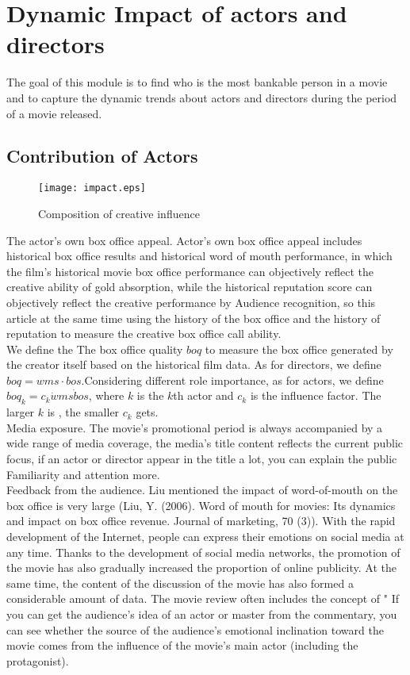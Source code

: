 \section{Dynamic Impact of actors and directors}
\label{sec:impact}
The goal of this module is to find who is the most bankable person in a movie and to capture the dynamic trends about actors and directors during the period of a movie released.\\

\subsection{Contribution of Actors}
\begin{figure}[!htbp]
\centering
\texttt{[image: impact.eps]}
\caption{Composition of creative influence}
\label{fig:mhin}
\end{figure}
The actor's own box office appeal. Actor's own box office appeal includes historical box office results and historical word of mouth performance, in which the film's historical movie box office performance can objectively reflect the creative ability of gold absorption, while the historical reputation score can objectively reflect the creative performance by Audience recognition, so this article at the same time using the history of the box office and the history of reputation to measure the creative box office call ability.\\
We define the The box office quality $boq$ to measure the box office generated by the creator itself based on the historical film data. As for directors, we define $boq=wms\cdot bos$.Considering different role importance, as for actors, we define $boq_k = c_k\dot wms\dot bos$, where $k$ is the $k$th actor and $c_k$ is the influence factor. The larger $k$ is , the smaller $c_k$ gets.\\
Media exposure. The movie's promotional period is always accompanied by a wide range of media coverage, the media's title content reflects the current public focus, if an actor or director appear in the title a lot, you can explain the public Familiarity and attention more.\\
Feedback from the audience. Liu mentioned the impact of word-of-mouth on the box office is very large (Liu, Y. (2006). Word of mouth for movies: Its dynamics and impact on box office revenue. Journal of marketing, 70 (3)). With the rapid development of the Internet, people can express their emotions on social media at any time. Thanks to the development of social media networks, the promotion of the movie has also gradually increased the proportion of online publicity. At the same time, the content of the discussion of the movie has also formed a considerable amount of data. The movie review often includes the concept of " If you can get the audience's idea of ​​an actor or master from the commentary, you can see whether the source of the audience's emotional inclination toward the movie comes from the influence of the movie's main actor (including the protagonist).\\

